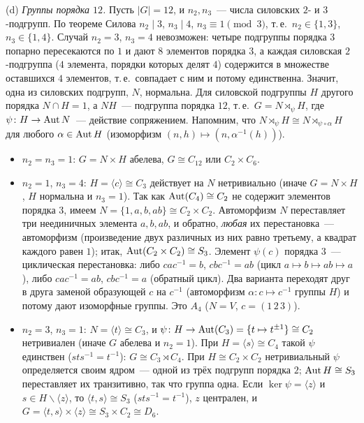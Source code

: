\begin{remark}
(d) \emph{Группы порядка $12$.} Пусть $|G|=12$, и $n_2,n_3$~--- числа силовских $2$- и $3$-подгрупп. По теореме Силова
$n_2\mid3$, $n_3\mid4$, $n_3\equiv1\pmod 3$, т.\,е.\ $n_2\in\{1,3\}$, $n_3\in\{1,4\}$. Случай $n_2=3$, $n_3=4$ невозможен: четыре подгруппы
порядка $3$ попарно пересекаются по $1$ и дают $8$ элементов порядка $3$, а каждая силовская $2$-подгруппа ($4$ элемента,
порядки которых делят $4$) содержится в множестве оставшихся $4$ элементов, т.\,е.\ совпадает с ним и потому единственна.
Значит, одна из силовских подгрупп, $N$, нормальна. Для силовской подгруппы $H$ другого порядка $N\cap H=1$, а $NH$~---
подгруппа порядка $12$, т.\,е.\ $G=N\rtimes_\psi H$, где $\psi\colon H\to\operatorname{Aut} N$~--- действие сопряжением. Напомним, что
$N\rtimes_\psi H\cong N\rtimes_{\psi\circ\alpha}H$ для любого $\alpha\in\operatorname{Aut} H$ (изоморфизм $(n,h)\mapsto(n,\alpha^{-1}(h))$).
\begin{itemize}
\item $n_2=n_3=1$: $G=N\times H$ абелева, $G\cong C_{12}$ или $C_2\times C_6$.
\item $n_2=1$, $n_3=4$: $H=\langle c\rangle\cong C_3$ действует на $N$ нетривиально (иначе $G=N\times H$, $H$ нормальна и $n_3=1$). Так
как $\operatorname{Aut}(C_4)\cong C_2$ не содержит элементов порядка $3$, имеем $N=\{1,a,b,ab\}\cong C_2\times C_2$. Автоморфизм $N$ переставляет
три неединичных элемента $a,b,ab$, и обратно, \emph{любая} их перестановка~--- автоморфизм (произведение двух различных из
них равно третьему, а квадрат каждого равен $1$); итак, $\operatorname{Aut}(C_2\times C_2)\cong S_3$. Элемент $\psi(c)$ порядка $3$~--- циклическая
перестановка: либо $cac^{-1}=b$, $cbc^{-1}=ab$ (цикл $a\mapsto b\mapsto ab\mapsto a$), либо $cac^{-1}=ab$, $cbc^{-1}=a$ (обратный цикл). Два варианта переходят друг в друга заменой образующей $c$ на $c^{-1}$
(автоморфизм $\alpha\colon c\mapsto c^{-1}$ группы $H$) и потому дают изоморфные группы. Это $A_4$ ($N=V$, $c=(1\,2\,3)$).
\item $n_2=3$, $n_3=1$: $N=\langle t\rangle\cong C_3$, и $\psi\colon H\to\operatorname{Aut}(C_3)=\{t\mapsto t^{\pm1}\}\cong C_2$ нетривиален (иначе $G$ абелева
и $n_2=1$). При $H=\langle s\rangle\cong C_4$ такой $\psi$ единствен ($sts^{-1}=t^{-1}$): $G\cong C_3\rtimes C_4$. При $H\cong C_2\times C_2$
нетривиальный $\psi$ определяется своим ядром~--- одной из трёх подгрупп порядка $2$; $\operatorname{Aut} H\cong S_3$ переставляет их
транзитивно, так что группа одна. Если $\ker\psi=\langle z\rangle$ и $s\in H\smallsetminus\langle z\rangle$, то $\langle t,s\rangle\cong S_3$
($sts^{-1}=t^{-1}$), $z$ централен, и $G=\langle t,s\rangle\times\langle z\rangle\cong S_3\times C_2\cong D_6$.

\end{itemize}
\end{remark}
